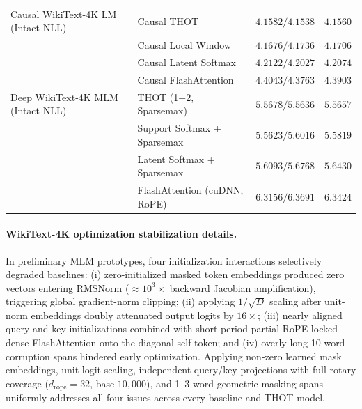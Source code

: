 \documentclass[11pt]{article}
\begin{document}
\begin{table}[htbp]
{\begin{tabular}{@{}llcc@{}}
    \midrule
    Causal WikiText-4K LM (Intact NLL) & Causal THOT & $4.1582 / 4.1538$ & $4.1560$ \\
    & Causal Local Window & $4.1676 / 4.1736$ & $4.1706$ \\
    & Causal Latent Softmax & $4.2122 / 4.2027$ & $4.2074$ \\
    & Causal FlashAttention & $4.4043 / 4.3763$ & $4.3903$ \\
    \midrule
    Deep WikiText-4K MLM (Intact NLL) & THOT (1+2, Sparsemax) & $5.5678 / 5.5636$ & $5.5657$ \\
    & Support Softmax + Sparsemax & $5.5623 / 5.6016$ & $5.5819$ \\
    & Latent Softmax + Sparsemax & $5.6093 / 5.6768$ & $5.6430$ \\
    & FlashAttention (cuDNN, RoPE) & $6.3156 / 6.3691$ & $6.3424$ \\
    \bottomrule
  \end{tabular}}
\end{table}

\paragraph{WikiText-4K optimization stabilization details.}
In preliminary MLM prototypes, four initialization interactions selectively degraded baselines: (i) zero-initialized masked token embeddings produced zero vectors entering RMSNorm ($\approx 10^3\times$ backward Jacobian amplification), triggering global gradient-norm clipping; (ii) applying $1/\sqrt{D}$ scaling after unit-norm embeddings doubly attenuated output logits by $16\times$; (iii) nearly aligned query and key initializations combined with short-period partial RoPE locked dense FlashAttention onto the diagonal self-token; and (iv) overly long 10-word corruption spans hindered early optimization. Applying non-zero learned mask embeddings, unit logit scaling, independent query/key projections with full rotary coverage ($d_{\text{rope}}=32$, base $10{,}000$), and 1--3 word geometric masking spans uniformly addresses all four issues across every baseline and THOT model.

{\footnotesize
\setlength{\bibsep}{2pt plus 0.5pt}


}
\end{document}
